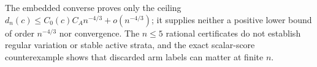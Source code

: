 The embedded converse proves only the ceiling \(d_n(c)\leq C_0(c)C_A n^{-4/3}+o(n^{-4/3})\); it supplies neither a positive lower bound of order \(n^{-4/3}\) nor convergence.  The \(n\leq5\) rational certificates do not establish regular variation or stable active strata, and the exact scalar-score counterexample shows that discarded arm labels can matter at finite \(n\).